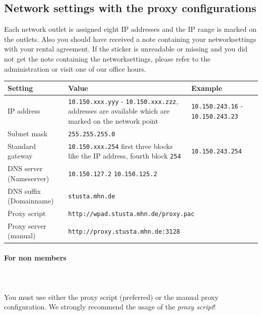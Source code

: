 \documentclass[a4paper,12pt]{scrartcl}
\begin{document}
\subsection*{Network settings with the proxy configurations}
Each network outlet is assigned eight IP addresses and the IP range is marked on the outlets. Also you should have received a note containing your networksettings with your rental agreement. If the sticker is unreadable or missing and you did not get the note containing the networksettings, please refer to the administration or visit one of our office hours.

\begin{center}
  \begin{tabularx}{\linewidth}{|lXp{.2\linewidth}|}
    \hline
    Setting & Value & Example \\
    \hline \hline
    IP address & \nolinkurl{10.150.xxx.yyy} - \nolinkurl{10.150.xxx.zzz}, \newline 8 addresses are available which are marked on the network point & \nolinkurl{10.150.243.16} - \nolinkurl{10.150.243.23} \\
    \hline
    Subnet mask & \nolinkurl{255.255.255.0} & \\
    \hline
    Standard gateway & \nolinkurl{10.150.xxx.254} \newline first three blocks like the IP address, fourth block \nolinkurl{254} & \nolinkurl{10.150.243.254} \\
    \hline
    DNS server (Nameserver) & \nolinkurl{10.150.127.2} \newline \nolinkurl{10.150.125.2} & \\
    \hline
    DNS suffix (Domainname) & \nolinkurl{stusta.mhn.de} & \\
    \hline
    Proxy script & \multicolumn{2}{l|}{\nolinkurl{http://wpad.stusta.mhn.de/proxy.pac}} \\
    \hline
    Proxy server (manual) & \multicolumn{2}{l|}{\nolinkurl{http://proxy.stusta.mhn.de:3128}} \\
    \hline
  \end{tabularx}
\end{center}

\newpage

\paragraph*{For non members}~\\
\\
You must use either the proxy script (preferred) or the manual proxy configuration. We strongly recommend the usage of the \emph{proxy script}!
\end{document}
